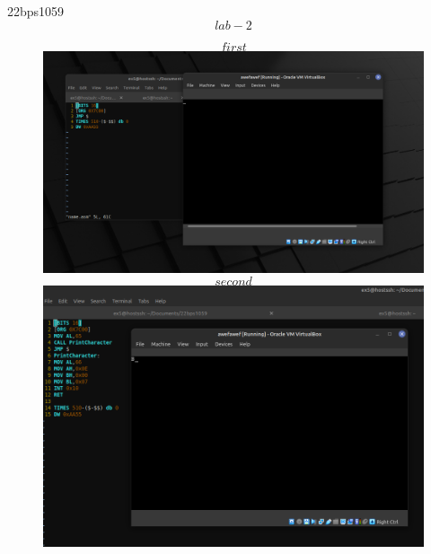 \documentclass{article}
\begin{document}
\centering
{\LARGE 22bps1059}
$$lab-2$$
\begin{figure}[htbp]
  \centering
    $$first$$
  \includegraphics[width=1\linewidth]{fig1.png}
    $$second$$
  \includegraphics[width=1\linewidth]{fig2.png}
\end{figure}
\end{document}
